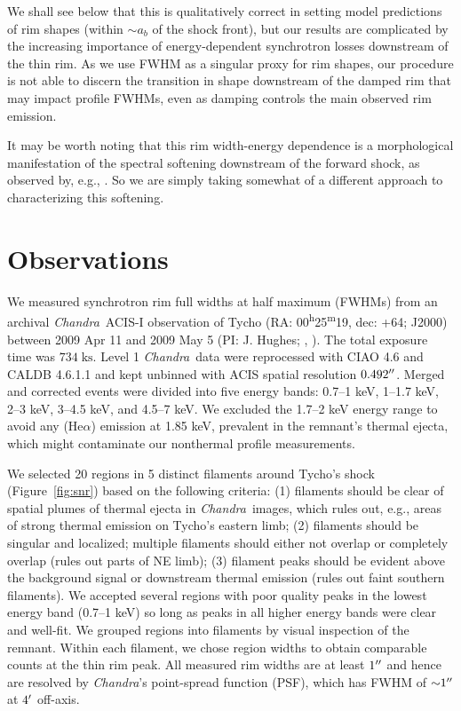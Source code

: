 \documentclass[iop, apj, numberedappendix]{emulateapj}
\newcommand*{\mt}{\mathrm}
\newcommand*{\unit}[1]{\;\mt{#1}}  %
\newcommand*{\abt}{\mathord{\sim}} %
\newcommand*{\tsup}{\textsuperscript}
\newcommand*{\Chandra}{\textit{Chandra}\ }
\begin{document}
We shall see below that this is qualitatively correct in setting model
predictions of rim shapes (within $\abt a_b$ of the shock front), but our
results are complicated by the increasing importance of energy-dependent
synchrotron losses downstream of the thin rim.  As we use FWHM as a singular
proxy for rim shapes, our procedure is not able to discern the transition in
shape downstream of the damped rim that may impact profile FWHMs, even as
damping controls the main observed rim emission.

It may be worth noting that this rim width-energy dependence is a morphological
manifestation of the spectral softening downstream of the forward shock, as
observed by, e.g., \citet{cassam-chenai2007}.  So we are simply taking somewhat
of a different approach to characterizing this softening.

\section{Observations}
\label{sec:observations}

We measured synchrotron rim full widths at half maximum (FWHMs) from an
archival \Chandra ACIS-I observation of Tycho
(RA: 00\tsup{h}25\tsup{m}19, dec: +64; J2000)
between 2009 Apr 11 and 2009 May 5 (PI: J. Hughes;
,
).
The total exposure time was $734 \unit{ks}$.
Level 1 \Chandra data were reprocessed with CIAO 4.6 and CALDB 4.6.1.1 and kept
unbinned with ACIS spatial resolution $0.492\mbox{$^{\prime\prime}$}$.
Merged and corrected events were divided into five energy bands:
0.7--1 keV, 1--1.7 keV, 2--3 keV, 3--4.5 keV, and 4.5--7 keV.
We excluded the 1.7--2 keV energy range to avoid any  (He$\alpha$)
emission at 1.85 keV, prevalent in the remnant's thermal ejecta, which
might contaminate our nonthermal profile measurements.

We selected 20 regions in 5 distinct filaments around Tycho's shock
(Figure~\ref{fig:snr}) based on the following criteria: (1) filaments should be
clear of spatial plumes of thermal ejecta in \Chandra images, which rules out,
e.g., areas of strong thermal emission on Tycho's eastern limb; (2) filaments
should be singular and localized; multiple filaments should either not
overlap or completely overlap (rules out parts of NE limb); (3) filament
peaks should be evident above the background signal or downstream thermal
emission (rules out faint southern filaments).  We accepted several
regions with poor quality peaks in the lowest energy band (0.7--1 keV) so long
as peaks in all higher energy bands were clear and well-fit.
We grouped regions into filaments by visual inspection of the remnant.
Within each filament, we chose region widths to obtain comparable counts
at the thin rim peak.
All measured rim widths are at least $1\mbox{$^{\prime\prime}$}$ and hence are resolved by
\textit{Chandra}'s point-spread function (PSF), which has FWHM of
$\abt 1\arcsec$ at $4\mbox{$^\prime$}$ off-axis.
\end{document}
